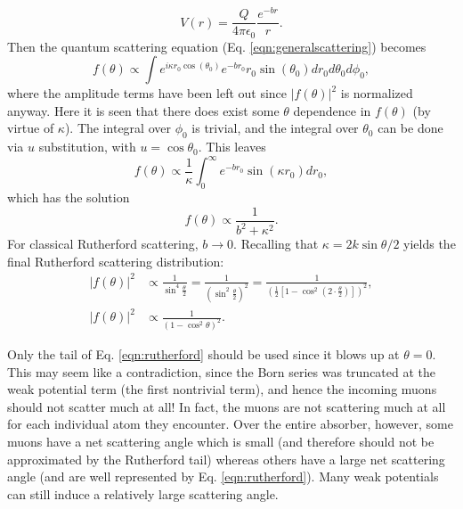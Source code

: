 \begin{equation} \nonumber
V(r)=\frac{Q}{4\pi\epsilon_0}\frac{e^{-br}}{r}.
\end{equation}
Then the quantum scattering equation (Eq. \eqref{eqn:generalscattering}) becomes
%
\begin{equation} \nonumber
f(\theta)\propto \int e^{i\kappa r_0\cos(\theta_0)}e^{-br_0}r_0\sin(\theta_0)dr_0 d\theta_0 d\phi_0,
\end{equation}
where the amplitude terms have been left out since $|f(\theta)|^2$ is normalized anyway. Here it is seen that there does exist some $\theta$ dependence in $f(\theta)$ (by virtue of $\kappa$). The integral over $\phi_0$ is trivial, and the integral over $\theta_0$ can be done via $u$ substitution, with $u=\cos\theta_0$. This leaves
\begin{equation} \nonumber
f(\theta)\propto \frac{1}{\kappa}\int_0^\infty e^{-br_0}\sin(\kappa r_0) dr_0,
\end{equation}
%
which has the solution
\begin{equation}\nonumber
f(\theta)\propto\frac{1}{b^2+\kappa^2}.
\end{equation}
For classical Rutherford scattering, $b\rightarrow 0$. Recalling that $\kappa=2k\sin{\theta/2}$ yields the final Rutherford scattering distribution:
\begin{align}
|f(\theta)|^2 &\propto \frac{1}{\sin^4 \frac{\theta}{2}}=\frac{1}{\left(\sin^2 \frac{\theta}{2}\right)^2}=\frac{1}{\left(\frac{1}{2}\left[1-\cos^2\left(2\cdot\frac{\theta}{2}\right)\right]\right)^2},\nonumber \\
|f(\theta)|^2  &\propto\frac{1}{(1-\cos^2{\theta})^2}. \label{eqn:rutherford}
\end{align}

Only the tail of Eq. \eqref{eqn:rutherford} should be used since it blows up at $\theta=0$. This may seem like a contradiction, since the Born series was truncated at the weak potential term (the first nontrivial term), and hence the incoming muons should not scatter much at all! In fact, the muons are not scattering much at all for each individual atom they encounter. Over the entire absorber, however, some muons have a net scattering angle which is small (and therefore should not be approximated by the Rutherford tail) whereas others have a large net scattering angle (and are well represented by Eq. \eqref{eqn:rutherford}). Many weak potentials can still induce a relatively large scattering angle.
